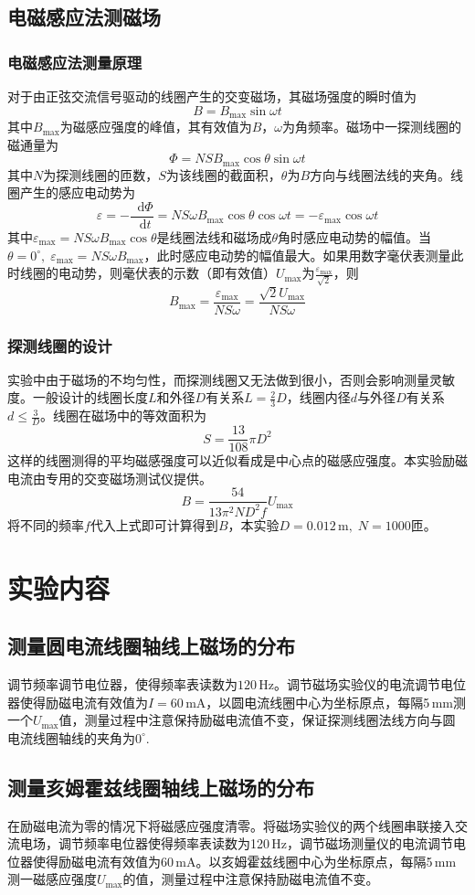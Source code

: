 \documentclass[UTF-8,twoside,cs4size]{ctexart}
\newcommand*{\dif}{\mathop{}\!\mathrm{d}}
\begin{document}
	\subsection{电磁感应法测磁场}
	\subsubsection{电磁感应法测量原理}
	对于由正弦交流信号驱动的线圈产生的交变磁场，其磁场强度的瞬时值为
	\[B=B_\max\sin\omega t\]
	其中$ B_\max $为磁感应强度的峰值，其有效值为$ B $，$ \omega $为角频率。磁场中一探测线圈的磁通量为
	\[\Phi=NSB_\max\cos\theta\sin\omega t\]
	其中$ N $为探测线圈的匝数，$ S $为该线圈的截面积，$ \theta $为$ B $方向与线圈法线的夹角。线圈产生的感应电动势为
	\[\varepsilon=-\frac{\dif\Phi}{\dif t}=NS\omega B_\max\cos\theta\cos\omega t=-\varepsilon_\max\cos\omega t\]
	其中$ \varepsilon_\max=NS\omega B_\max\cos\theta $是线圈法线和磁场成$ \theta $角时感应电动势的幅值。当$ \theta=0^\circ,\;\varepsilon_\max=NS\omega B_\max $，此时感应电动势的幅值最大。如果用数字毫伏表测量此时线圈的电动势，则毫伏表的示数（即有效值）$ U_\max $为$ \frac{\varepsilon_\max}{\sqrt 2} $，则
	\[B_\max=\frac{\varepsilon_\max}{NS\omega}=\frac{\sqrt 2U_\max}{NS\omega}\]
	\subsubsection{探测线圈的设计}
	实验中由于磁场的不均匀性，而探测线圈又无法做到很小，否则会影响测量灵敏度。一般设计的线圈长度$ L $和外径$ D $有关系$ L=\frac23D $，线圈内径$ d $与外径$ D $有关系$ d\leq\frac3D $。线圈在磁场中的等效面积为
	\[S=\frac{13}{108}\pi D^2\]
	这样的线圈测得的平均磁感强度可以近似看成是中心点的磁感应强度。本实验励磁电流由专用的交变磁场测试仪提供。
	\[B=\frac{54}{13\pi^2ND^2f}U_\max\]
	将不同的频率$ f $代入上式即可计算得到$ B $，本实验$ D=0.012\,\mathrm m,\;N=1000 $匝。
	
	\section{实验内容}
	\subsection{测量圆电流线圈轴线上磁场的分布}
	调节频率调节电位器，使得频率表读数为$ 120\,\mathrm{Hz} $。调节磁场实验仪的电流调节电位器使得励磁电流有效值为$ I=60\,\mathrm{mA} $，以圆电流线圈中心为坐标原点，每隔5\,mm测一个$ U_\max $值，测量过程中注意保持励磁电流值不变，保证探测线圈法线方向与圆电流线圈轴线的夹角为$ 0^\circ $.
	\subsection{测量亥姆霍兹线圈轴线上磁场的分布}
	在励磁电流为零的情况下将磁感应强度清零。将磁场实验仪的两个线圈串联接入交流电场，调节频率电位器使得频率表读数为120\,Hz，调节磁场测量仪的电流调节电位器使得励磁电流有效值为60\,mA。以亥姆霍兹线圈中心为坐标原点，每隔5\,mm测一磁感应强度$ U_\max $的值，测量过程中注意保持励磁电流值不变。
\end{document}

